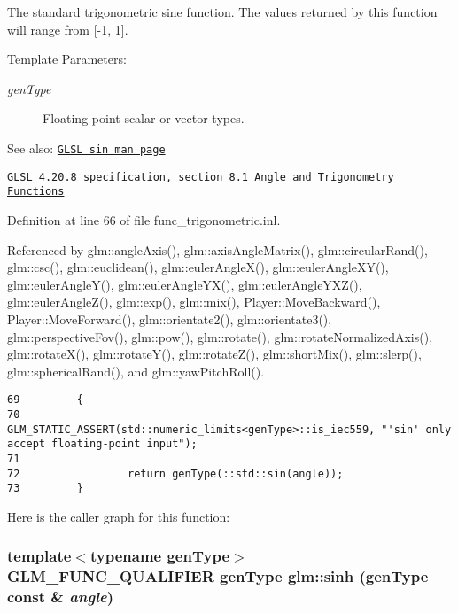 The standard trigonometric sine function. The values returned by this function will range from \mbox{[}-1, 1\mbox{]}.

\begin{Desc}
\item[Template Parameters:]
\begin{description}
\item[{\em genType}]Floating-point scalar or vector types.\end{description}
\end{Desc}
\begin{Desc}
\item[See also:]\href{http://www.opengl.org/sdk/docs/manglsl/xhtml/sin.xml}{\tt GLSL sin man page} 

\href{http://www.opengl.org/registry/doc/GLSLangSpec.4.20.8.pdf}{\tt GLSL 4.20.8 specification, section 8.1 Angle and Trigonometry Functions} \end{Desc}


Definition at line 66 of file func\_\-trigonometric.inl.

Referenced by glm::angleAxis(), glm::axisAngleMatrix(), glm::circularRand(), glm::csc(), glm::euclidean(), glm::eulerAngleX(), glm::eulerAngleXY(), glm::eulerAngleY(), glm::eulerAngleYX(), glm::eulerAngleYXZ(), glm::eulerAngleZ(), glm::exp(), glm::mix(), Player::MoveBackward(), Player::MoveForward(), glm::orientate2(), glm::orientate3(), glm::perspectiveFov(), glm::pow(), glm::rotate(), glm::rotateNormalizedAxis(), glm::rotateX(), glm::rotateY(), glm::rotateZ(), glm::shortMix(), glm::slerp(), glm::sphericalRand(), and glm::yawPitchRoll().

\begin{Code}\begin{verbatim}69         {
70                 GLM_STATIC_ASSERT(std::numeric_limits<genType>::is_iec559, "'sin' only accept floating-point input");
71 
72                 return genType(::std::sin(angle));
73         }
\end{verbatim}
\end{Code}




Here is the caller graph for this function:\hypertarget{group__core__func__trigonometric_g925002c6a847894241278997d189429a}{
\subsubsection[sinh]{\setlength{\rightskip}{0pt plus 5cm}template$<$typename genType$>$ GLM\_\-FUNC\_\-QUALIFIER genType glm::sinh (genType const \& {\em angle})}}
\label{group__core__func__trigonometric_g925002c6a847894241278997d189429a}


